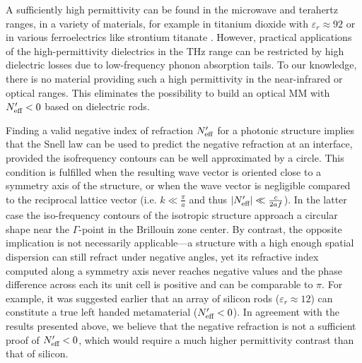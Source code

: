 \documentclass[letterpaper,12pt]{report}
\begin{document}
A sufficiently high permittivity can be found in the microwave and terahertz ranges, 
in a variety of materials, for example in titanium dioxide with $\varepsilon_r \approx 92$ \cite{nemec2009tunable} 
or in various ferroelectrics like strontium titanate \cite{skoromets2011tuning}. However, practical applications of
the high-permittivity dielectrics in the THz range can be restricted by high dielectric
losses due to low-frequency phonon absorption tails. To our knowledge, there is no
material providing such a high permittivity in the near-infrared or optical ranges. This
eliminates the possibility to build an optical MM with $N_{\text{eff} }'<0$ based on dielectric
rods.

Finding a valid negative index of refraction $N_{\text{eff} }'$ for a photonic structure implies
that the Snell law can be used to predict the negative refraction at an interface, provided
the isofrequency contours can be well approximated by a circle. This condition is fulfilled
when the resulting wave vector is oriented close to a symmetry axis of the structure, or when 
the wave vector is negligible compared to the reciprocal lattice vector (i.e. $k\ll \frac{\pi}{a}$ and 
thus $|N_{\text{eff} }'| \ll \frac{c}{2af}$). 
In the latter case the iso-frequency contours of the isotropic structure approach a circular shape
near the $\Gamma$-point in the Brillouin zone center. 
%
By contrast, the opposite implication is not necessarily applicable---a structure with a high
enough spatial dispersion can still refract under negative angles, 
yet its refractive index computed along a symmetry axis never reaches negative values and the phase difference across each its 
unit cell is positive and can be comparable to $\pi$.
For example, it was suggested earlier  \cite{Vynck2009} that an array of 
silicon rods ($\varepsilon_r \approx 12$) can constitute a true left handed metamaterial ($N_{\text{eff} }'<0$).
In agreement with the results presented above, we believe that the negative refraction 
is not a sufficient proof of $N_{\text{eff} }'<0$, which would require a much higher permittivity contrast than that of silicon. 
\end{document}
